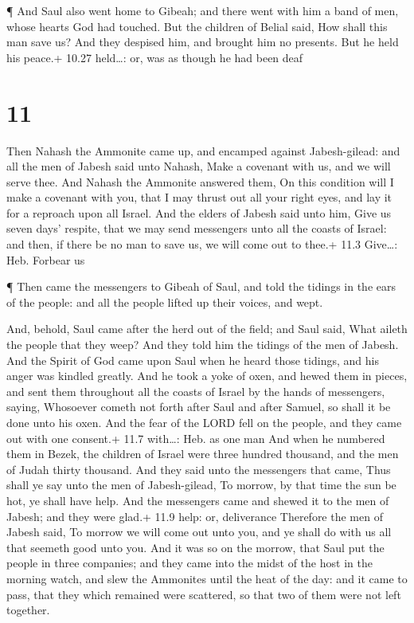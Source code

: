  ¶ And Saul also went home to Gibeah; and there went with
him a band of men, whose hearts God had touched.  But the
children of Belial said, How shall this man save us? And they despised
him, and brought him no presents. But he held his peace.+ 10.27
held\ldots: or, was as though he had been deaf

\hypertarget{section-10}{%
\section{11}\label{section-10}}

 Then Nahash the Ammonite came up, and encamped against
Jabesh-gilead: and all the men of Jabesh said unto Nahash, Make a
covenant with us, and we will serve thee.  And Nahash the
Ammonite answered them, On this condition will I make a covenant with
you, that I may thrust out all your right eyes, and lay it for a
reproach upon all Israel.  And the elders of Jabesh said
unto him, Give us seven days' respite, that we may send messengers unto
all the coasts of Israel: and then, if there be no man to save us, we
will come out to thee.+ 11.3 Give\ldots: Heb. Forbear us

 ¶ Then came the messengers to Gibeah of Saul, and told the
tidings in the ears of the people: and all the people lifted up their
voices, and wept.

 And, behold, Saul came after the herd out of the field; and
Saul said, What aileth the people that they weep? And they told him the
tidings of the men of Jabesh.  And the Spirit of God came
upon Saul when he heard those tidings, and his anger was kindled
greatly.  And he took a yoke of oxen, and hewed them in
pieces, and sent them throughout all the coasts of Israel by the hands
of messengers, saying, Whosoever cometh not forth after Saul and after
Samuel, so shall it be done unto his oxen. And the fear of the LORD fell
on the people, and they came out with one consent.+ 11.7 with\ldots:
Heb. as one man  And when he numbered them in Bezek, the
children of Israel were three hundred thousand, and the men of Judah
thirty thousand.  And they said unto the messengers that
came, Thus shall ye say unto the men of Jabesh-gilead, To morrow, by
that time the sun be hot, ye shall have help. And the messengers came
and shewed it to the men of Jabesh; and they were glad.+ 11.9 help: or,
deliverance  Therefore the men of Jabesh said, To morrow we
will come out unto you, and ye shall do with us all that seemeth good
unto you.  And it was so on the morrow, that Saul put the
people in three companies; and they came into the midst of the host in
the morning watch, and slew the Ammonites until the heat of the day: and
it came to pass, that they which remained were scattered, so that two of
them were not left together.


